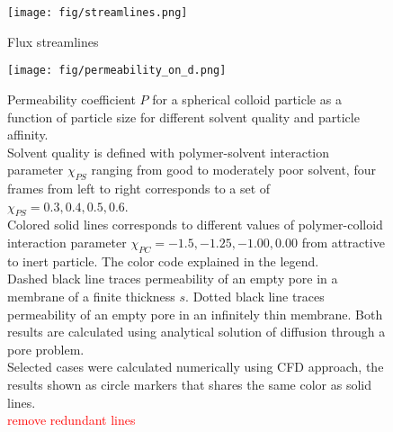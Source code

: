 \documentclass[12pt, a4paper]{article}
\newcommand\todo[1]{\textcolor{red}{#1}}
\begin{document}
\begin{figure}
    \centering
    \texttt{[image: fig/streamlines.png]}
    \caption{
    Flux streamlines
    }
    \label{fig:streamlines}
\end{figure}

\begin{figure}
    \centering
    \texttt{[image: fig/permeability\_on\_d.png]}
    \caption{
        Permeability coefficient $P$ for a spherical colloid particle as a function of particle size for different solvent quality and particle affinity.
        \\
        Solvent quality is defined with polymer-solvent interaction parameter $\chi_{PS}$ ranging from good to moderately poor solvent, four frames from left to right corresponds to a set of $\chi_{PS} = {0.3, 0.4, 0.5, 0.6}$.
        \\
        Colored solid lines corresponds to different values of polymer-colloid interaction parameter $\chi_{PC} = {-1.5, -1.25, -1.00, 0.00}$ from attractive to inert particle. 
        The color code explained in the legend.
        \\
        Dashed black line traces permeability of an empty pore in a membrane of a finite thickness $s$.
        Dotted black line traces permeability of an empty pore in an infinitely thin membrane.
        Both results are calculated using analytical solution of diffusion through a pore problem.
        \\
        Selected cases were calculated numerically using CFD approach, the results shown as circle markers that shares the same color as solid lines.
        \\
        \todo{remove redundant lines}
        }
        \label{fig:permeability_on_d}
\end{figure}
\end{document}
